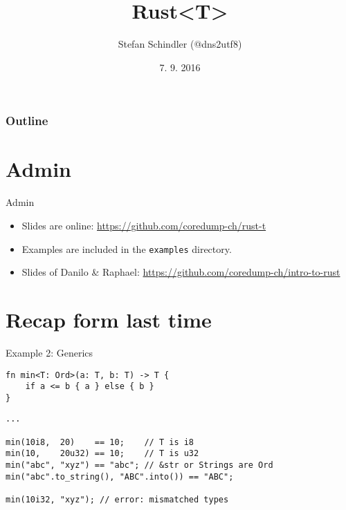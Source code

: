 \documentclass[aspectratio=1610,t]{beamer}
\title{Rust<T>}
\date{7. 9. 2016}
\author{Stefan Schindler (@dns2utf8)}
\institute{Coredump Rapperswil}
\begin{document}
{
\maketitle
}

\begin{frame}[noframenumbering]
	\frametitle{Outline}
	\tableofcontents
\end{frame}



{
\section{Admin}
}

\begin{frame}[fragile]{Admin}

\begin{itemize}
  \item Slides are online:
        \url{https://github.com/coredump-ch/rust-t}
  \item Examples are included in the \texttt{examples} directory.
  \item Slides of Danilo \& Raphael:
        \url{https://github.com/coredump-ch/intro-to-rust}
\end{itemize}

\end{frame}

{
\section{Recap form last time}
}

\begin{frame}[fragile]{Example 2: Generics}

\begin{verbatim}
fn min<T: Ord>(a: T, b: T) -> T {
    if a <= b { a } else { b }
}
\end{verbatim}
\pause
\begin{verbatim}
...

min(10i8,  20)    == 10;    // T is i8
min(10,    20u32) == 10;    // T is u32
min("abc", "xyz") == "abc"; // &str or Strings are Ord
min("abc".to_string(), "ABC".into()) == "ABC";

min(10i32, "xyz"); // error: mismatched types
\end{verbatim}

\end{frame}
\end{document}
